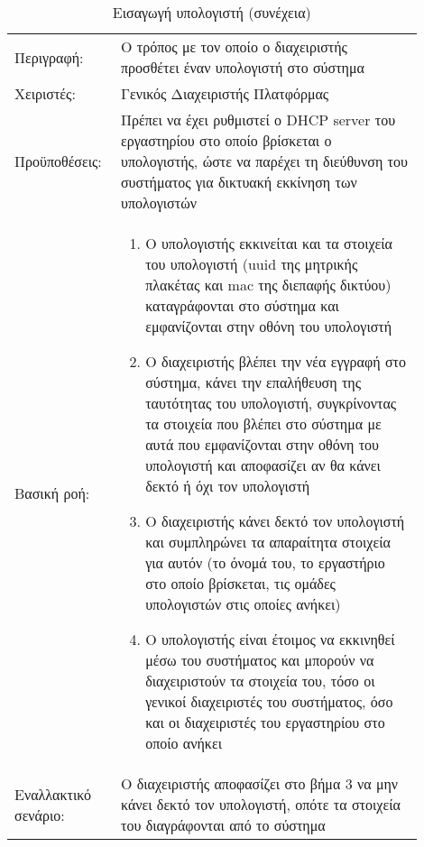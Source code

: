 %
%
\begin{longtable}{|p{0.2\linewidth}|p{0.7\linewidth}|} 
	\caption{Εισαγωγή υπολογιστή} \label{tab:use-case-add-computer} \\
	\hline
	\endfirsthead
	\caption{Εισαγωγή υπολογιστή (συνέχεια)} \\ 
	\endhead \endfoot 
	Περιγραφή: & Ο τρόπος με τον οποίο ο διαχειριστής προσθέτει έναν υπολογιστή στο σύστημα \\ \hline
	Χειριστές: & Γενικός Διαχειριστής Πλατφόρμας \\ \hline
	Προϋποθέσεις: & Πρέπει να έχει ρυθμιστεί ο DHCP server του εργαστηρίου στο οποίο βρίσκεται ο υπολογιστής, ώστε να παρέχει τη διεύθυνση του συστήματος για δικτυακή εκκίνηση των υπολογιστών \\ \hline
	Βασική ροή: & 
	\begin{enumerate}
		\vspace{-1cm}
		\addtolength{\itemindent}{-0.4cm}
		\item Ο υπολογιστής εκκινείται και τα στοιχεία του υπολογιστή (uuid της μητρικής πλακέτας και mac της διεπαφής δικτύου) καταγράφονται στο σύστημα και εμφανίζονται στην οθόνη του υπολογιστή
		\item Ο διαχειριστής βλέπει την νέα εγγραφή στο σύστημα, κάνει την επαλήθευση της ταυτότητας του υπολογιστή, συγκρίνοντας τα στοιχεία που βλέπει στο σύστημα με αυτά που εμφανίζονται στην οθόνη του υπολογιστή και αποφασίζει αν θα κάνει δεκτό ή όχι τον υπολογιστή
		\item Ο διαχειριστής κάνει δεκτό τον υπολογιστή και συμπληρώνει τα απαραίτητα στοιχεία για αυτόν (το όνομά του, το εργαστήριο στο οποίο βρίσκεται, τις ομάδες υπολογιστών στις οποίες ανήκει)
		\item Ο υπολογιστής είναι έτοιμος να εκκινηθεί μέσω του συστήματος και μπορούν να διαχειριστούν τα στοιχεία του, τόσο οι γενικοί διαχειριστές του συστήματος, όσο και οι διαχειριστές του εργαστηρίου στο οποίο ανήκει
		\vspace{-0.7cm}
	\end{enumerate} \\ \hline
	Εναλλακτικό σενάριο: & Ο διαχειριστής αποφασίζει στο βήμα 3 να μην κάνει δεκτό τον υπολογιστή, οπότε τα στοιχεία του διαγράφονται από το σύστημα \\ \hline
\end{longtable}
